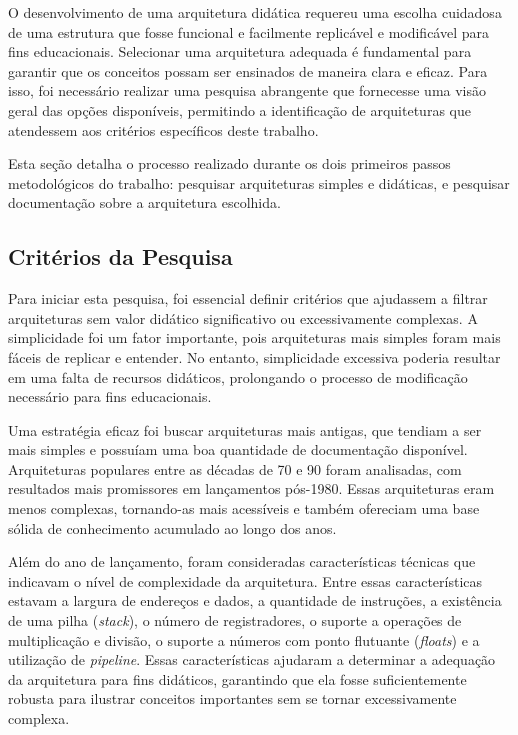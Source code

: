 \documentclass[
	12pt,				%
	openright,			%
	oneside,			%
	a4paper,			%
	english,			%
	french,				%
	spanish,			%
	brazil,				%
	]{abntex2}
\begin{document}
O desenvolvimento de uma arquitetura didática requereu uma escolha cuidadosa de uma estrutura que fosse funcional e facilmente replicável e modificável para fins educacionais. Selecionar uma arquitetura adequada é fundamental para garantir que os conceitos possam ser ensinados de maneira clara e eficaz. Para isso, foi necessário realizar uma pesquisa abrangente que fornecesse uma visão geral das opções disponíveis, permitindo a identificação de arquiteturas que atendessem aos critérios específicos deste trabalho.

Esta seção detalha o processo realizado durante os dois primeiros passos metodológicos do trabalho: pesquisar arquiteturas simples e didáticas, e pesquisar documentação sobre a arquitetura escolhida.

\subsection{Critérios da Pesquisa}

Para iniciar esta pesquisa, foi essencial definir critérios que ajudassem a filtrar arquiteturas sem valor didático significativo ou excessivamente complexas. A simplicidade foi um fator importante, pois arquiteturas mais simples foram mais fáceis de replicar e entender. No entanto, simplicidade excessiva poderia resultar em uma falta de recursos didáticos, prolongando o processo de modificação necessário para fins educacionais.

Uma estratégia eficaz foi buscar arquiteturas mais antigas, que tendiam a ser mais simples e possuíam uma boa quantidade de documentação disponível. Arquiteturas populares entre as décadas de 70 e 90 foram analisadas, com resultados mais promissores em lançamentos pós-1980. Essas arquiteturas eram menos complexas, tornando-as mais acessíveis e também ofereciam uma base sólida de conhecimento acumulado ao longo dos anos.

Além do ano de lançamento, foram consideradas características técnicas que indicavam o nível de complexidade da arquitetura. Entre essas características estavam a largura de endereços e dados, a quantidade de instruções, a existência de uma pilha (\textit{stack}), o número de registradores, o suporte a operações de multiplicação e divisão, o suporte a números com ponto flutuante (\textit{floats}) e a utilização de \textit{pipeline}. Essas características ajudaram a determinar a adequação da arquitetura para fins didáticos, garantindo que ela fosse suficientemente robusta para ilustrar conceitos importantes sem se tornar excessivamente complexa.
\end{document}
